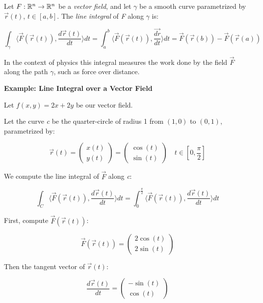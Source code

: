 Let \( F : \mathbb{R}^n \to \mathbb{R}^n \) be a \emph{vector field}, and let \( \gamma \) be a 
smooth curve parametrized by \( \vec{r}(t) \), \( t \in [a, b] \). 
The \emph{line integral} of \emph{F} along \( \gamma \) is:

\[
    \int_\gamma \langle \vec{F}(\vec{r}(t)), \frac{d\vec{r}(t)}{dt} \rangle dt = 
    \int_a^b \langle \vec{F}(\vec{r}(t)), \frac{\vec{dr}}{dt} \rangle dt = \vec{F}(\vec{r}(b)) 
    - \vec{F}(\vec{r}(a))
\]

In the context of physics this integral measures the work done by the field \( \vec{F} \) 
along the path \( \gamma \), such as force over distance.
\vspace{\baselineskip}

\textbf{Example: Line Integral over a Vector Field}
\vspace{\baselineskip}

Let \( f(x, y) = 2x + 2y \) be our vector field. 
\vspace{\baselineskip}

Let the curve \emph{c} be the quarter-circle of radius 1 from \( (1, 0) \) to \( (0, 1) \), 
parametrized by:

\[
    \vec{r}(t) = 
    \begin{pmatrix}
        x(t) \\ y(t)
    \end{pmatrix}
    =
    \begin{pmatrix}
    \cos(t) \\ \sin(t)
    \end{pmatrix}  
    \quad t \in \left[0, \frac{\pi}{2}\right]
\]

We compute the line integral of \( \vec{F} \) along \emph{c}:

\[
    \int_C \langle \vec{F}(\vec{r}(t)), \frac{d \vec{r}(t)}{dt}\rangle dt = 
    \int_0^{\frac{\pi}{2}} \langle\vec{F}(\vec{r}(t)), \frac{d \vec{r}(t)}{dt} \rangle dt
\]

First, compute \(\vec{F}(\vec{r}(t))\):

\[
    \vec{F}(\vec{r}(t)) = 
    \begin{pmatrix}
        2\cos(t) \\ 
        2\sin(t)
    \end{pmatrix}
\]

Then the tangent vector of \(\vec{r}(t)\):

\[
    \frac{d \vec{r}(t)}{dt} = 
    \begin{pmatrix}
    -\sin(t) \\ 
    \cos(t)
    \end{pmatrix}
\]

